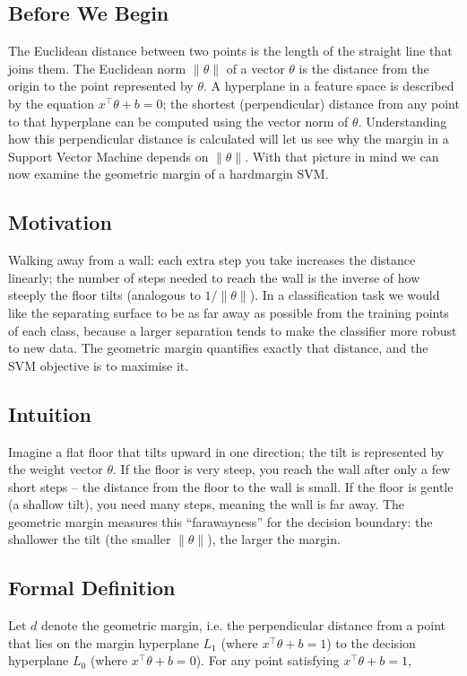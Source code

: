 \documentclass[12pt, a4paper]{article}
\begin{document}
\subsection{Before We Begin}
The Euclidean distance between two points is the length of the straight line that joins them.  
The Euclidean norm \(\|\theta\|\) of a vector \(\theta\) is the distance from the origin to the point represented by \(\theta\).  
A hyperplane in a feature space is described by the equation \(x^{\top}\theta+b=0\); the shortest (perpendicular) distance from any point to that hyperplane can be computed using the vector norm of \(\theta\).  
Understanding how this perpendicular distance is calculated will let us see why the margin in a Support Vector Machine depends on \(\|\theta\|\).  
With that picture in mind we can now examine the geometric margin of a hardmargin SVM.

\subsection{Motivation}
Walking away from a wall: each extra step you take increases the distance linearly; the number of steps needed to reach the wall is the inverse of how steeply the floor tilts (analogous to \(1/\|\theta\|\)).  
In a classification task we would like the separating surface to be as far away as possible from the training points of each class, because a larger separation tends to make the classifier more robust to new data.  
The geometric margin quantifies exactly that distance, and the SVM objective is to maximise it.

\subsection{Intuition}
Imagine a flat floor that tilts upward in one direction; the tilt is represented by the weight vector \(\theta\).  
If the floor is very steep, you reach the wall after only a few short steps -- the distance from the floor to the wall is small.  
If the floor is gentle (a shallow tilt), you need many steps, meaning the wall is far away.  
The geometric margin measures this ``farawayness'' for the decision boundary: the shallower the tilt (the smaller \(\|\theta\|\)), the larger the margin.

\subsection{Formal Definition}
Let \(d\) denote the geometric margin, i.e. the perpendicular distance from a point that lies on the margin hyperplane \(L_{1}\) (where \(x^{\top}\theta+b=1\)) to the decision hyperplane \(L_{0}\) (where \(x^{\top}\theta+b=0\)).  
For any point satisfying \(x^{\top}\theta+b=1\),
\end{document}
